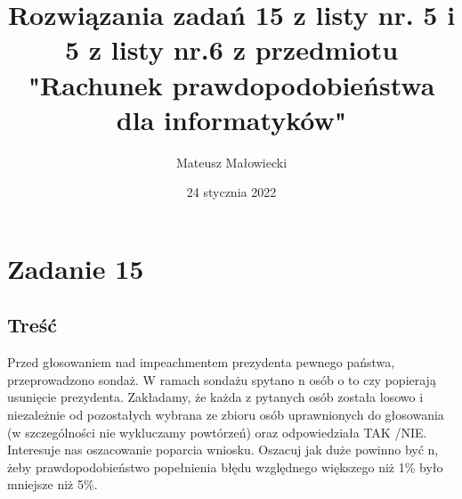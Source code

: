\documentclass[10pt, a4paper]{article}
\title{Rozwiązania zadań 15 z listy nr. 5 i 5 z listy nr.6 z przedmiotu "Rachunek prawdopodobieństwa dla informatyków"}
\date{24 stycznia 2022}
\author{Mateusz Małowiecki}
\begin{document}
\maketitle
\section*{Zadanie 15}
\subsection*{Treść}
Przed głosowaniem nad impeachmentem prezydenta pewnego państwa, przeprowadzono sondaż. W ramach sondażu spytano n osób o to czy popierają usunięcie prezydenta. Zakładamy, że każda z pytanych osób została losowo i niezależnie od pozostałych wybrana ze zbioru osób uprawnionych do głosowania (w szczególności nie wykluczamy powtórzeń) oraz odpowiedziała TAK /NIE. Interesuje nas oszacowanie poparcia wniosku. Oszacuj jak duże powinno być n, żeby prawdopodobieństwo popełnienia błędu względnego większego niż 1\% było mniejsze 
niż 5\%.
\end{document}
